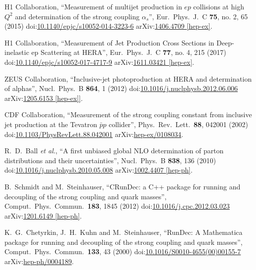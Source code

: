 \begin{thebibliography}{99}
H1 Collaboration, ``Measurement of multijet production in $ep$ collisions at high $Q^2$ and determination of the strong coupling $\alpha_s$'', Eur.\ Phys.\ J.\ C {\bf 75}, no. 2, 65 (2015) doi:\href{http://dx.doi.org/10.1140/epjc/s10052-014-3223-6}{10.1140/epjc/s10052-014-3223-6} arXiv:\href{https://arxiv.org/abs/1406.4709}{1406.4709 [hep-ex]}.

H1 Collaboration, ``Measurement of Jet Production Cross Sections in Deep-inelastic ep Scattering at HERA'', Eur.\ Phys.\ J.\ C {\bf 77}, no. 4, 215 (2017) doi:\href{http://dx.doi.org/10.1140/epjc/s10052-017-4717-9}{10.1140/epjc/s10052-017-4717-9} arXiv:\href{https://arxiv.org/abs/1611.03421}{1611.03421 [hep-ex]}.

ZEUS Collaboration, ``Inclusive-jet photoproduction at HERA and determination of alphas'', Nucl.\ Phys.\ B {\bf 864}, 1 (2012) doi:\href{http://dx.doi.org/10.1016/j.nuclphysb.2012.06.006}{10.1016/j.nuclphysb.2012.06.006} arXiv:\href{https://arxiv.org/abs/1205.6153}{1205.6153 [hep-ex]]}.

CDF Collaboration, ``Measurement of the strong coupling constant from inclusive jet production at the Tevatron $\bar{p}p$ collider'', Phys.\ Rev.\ Lett.\ {\bf 88}, 042001 (2002) doi:\href{http://dx.doi.org/10.1103/PhysRevLett.88.042001}{10.1103/PhysRevLett.88.042001} arXiv:\href{https://arxiv.org/pdf/hep-ex/0108034.pdf}{hep-ex/0108034}.

R.~D.~Ball {\it et al.}, ``A first unbiased global NLO determination of parton distributions and their uncertainties'', Nucl.\ Phys.\ B {\bf 838}, 136 (2010) doi:\href{http://dx.doi.org/10.1016/j.nuclphysb.2010.05.008}{10.1016/j.nuclphysb.2010.05.008} arXiv:\href{https://arxiv.org/abs/1002.4407}{1002.4407 [hep-ph]}.

B.~Schmidt and M.~Steinhauser, ``CRunDec: a C++ package for running and decoupling of the strong coupling and quark masses'', Comput.\ Phys.\ Commun.\ {\bf 183}, 1845 (2012) doi:\href{http://dx.doi.org/10.1016/j.cpc.2012.03.023}{10.1016/j.cpc.2012.03.023} arXiv:\href{https://arxiv.org/abs/1201.6149}{1201.6149 [hep-ph]}.

K.~G.~Chetyrkin, J.~H.~Kuhn and M.~Steinhauser, ``RunDec: A Mathematica package for running and decoupling of the strong coupling and quark masses'', Comput.\ Phys.\ Commun.\ {\bf 133}, 43 (2000) doi:\href{http://dx.doi.org/10.1016/S0010-4655(00)00155-7}{10.1016/S0010-4655(00)00155-7} arXiv:\href{https://arxiv.org/abs/hep-ph/0004189}{hep-ph/0004189}.


\end{thebibliography}

